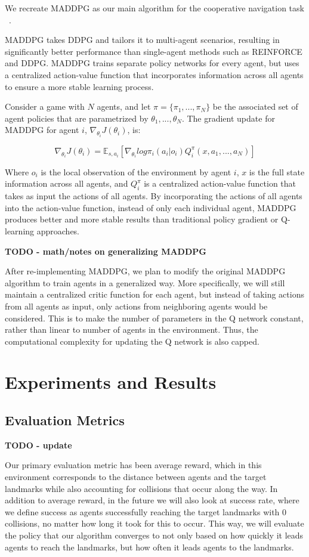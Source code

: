 \documentclass{article}
\begin{document}
We recreate MADDPG as our main algorithm for the cooperative navigation task ~\cite{maddpg}.

MADDPG takes DDPG and tailors it to multi-agent scenarios, resulting in significantly better performance than single-agent methods such as REINFORCE and DDPG. MADDPG trains separate policy networks for every agent, but uses a centralized action-value function that incorporates information across all agents to ensure a more stable learning process. 

Consider a game with $N$ agents, and let $\pi = \{\pi_1, ..., \pi_N\}$ be the associated set of agent policies that are parametrized by $\theta_1, ..., \theta_N$. The gradient update for MADDPG for agent $i$, $\nabla_{\theta_i} J(\theta_i)$, is:

$$\nabla_{\theta_i}J(\theta_i) = \mathbb{E}_{s, a_i}[\nabla_{\theta_i}log \pi_i(a_i|o_i)Q^{\pi}_i(x, a_1, ..., a_N)]$$

Where $o_i$ is the local observation of the environment by agent $i$, $x$ is the full state information across all agents, and $Q^{\pi}_i$ is a centralized action-value function that takes as input the actions of all agents. By incorporating the actions of all agents into the action-value function, instead of only each individual agent, MADDPG produces better and more stable results than traditional policy gradient or Q-learning approaches.

\textbf{TODO - math/notes on generalizing MADDPG}

After re-implementing MADDPG, we plan to modify the original MADDPG algorithm to train agents in a generalized way. More specifically, we will still maintain a centralized critic function for each agent, but instead of taking actions from all agents as input, only actions from neighboring agents would be considered. This is to make the number of parameters in the Q network constant, rather than linear to number of agents in the environment. Thus, the computational complexity for updating the Q network is also capped.

\section{Experiments and Results}
\subsection{Evaluation Metrics}
\textbf{TODO - update}


Our primary evaluation metric has been average reward, which in this environment corresponds to the distance between agents and the target landmarks while also accounting for collisions that occur along the way. In addition to average reward, in the future we will also look at success rate, where we define success as agents successfully reaching the target landmarks with 0 collisions, no matter how long it took for this to occur. This way, we will evaluate the policy that our algorithm converges to not only based on how quickly it leads agents to reach the landmarks, but how often it leads agents to the landmarks.
\end{document}
